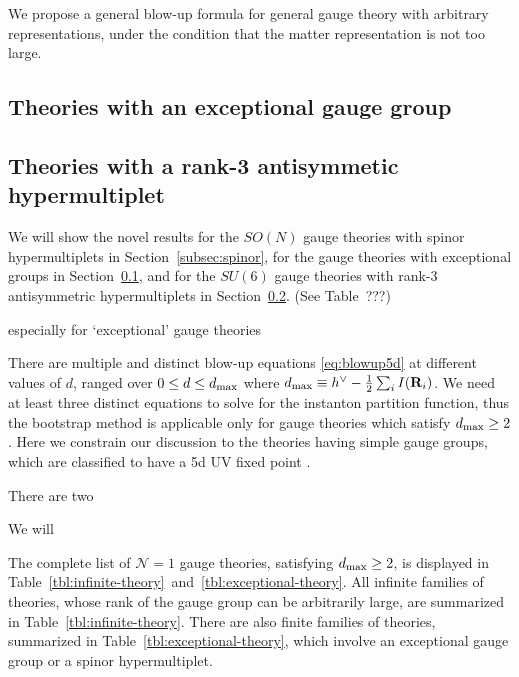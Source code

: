 \documentclass[letterpaper, 11pt]{article}
\begin{document}
{%
We propose a general blow-up formula for general gauge theory with arbitrary representations, under the condition that the matter representation is not too large.

\subsection{Theories with an exceptional gauge group}
\label{subsec:exceptional}
\subsection{Theories with a rank-3 antisymmetic hypermultiplet}
\label{subsec:rank3}
% 

We will show the novel results for the $SO(N)$ gauge theories with spinor hypermultiplets in Section~\ref{subsec:spinor}, for the gauge theories with exceptional groups in Section~\ref{subsec:exceptional}, and for the $SU(6)$ gauge theories with rank-3 antisymmetric hypermultiplets in Section~\ref{subsec:rank3}. (See Table~???)



especially for `exceptional' gauge theories 



There are multiple and distinct blow-up equations \eqref{eq:blowup5d} at different values of $d$, ranged over $0 \leq d \leq d_{\rm max}$ where $d_{\rm max} \equiv h^\vee 
- \frac{1}{2}\sum_{i} I(\mathbf{R}_i)$. We need at least three distinct equations to solve for the instanton partition function, thus the bootstrap method is applicable only for gauge theories which satisfy $d_{\rm max} \geq 2$. Here we constrain our discussion to the theories having simple gauge groups, which are classified to have a 5d UV fixed point \cite{Jefferson:2017ahm}. 


There are two 




We will 



The complete list of $\mathcal{N}=1$ gauge theories, satisfying $d_{\rm max} \geq 2$, is displayed in Table~\ref{tbl:infinite-theory}~and~\ref{tbl:exceptional-theory}.
All infinite families of theories, whose rank of the gauge group can be arbitrarily large, are summarized in Table~\ref{tbl:infinite-theory}. There are also finite families of theories, summarized in Table~\ref{tbl:exceptional-theory}, which involve an exceptional gauge group or a spinor hypermultiplet. 

}
\end{document}
